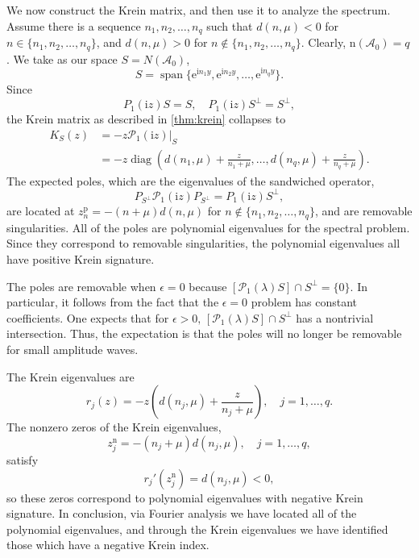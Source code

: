 \documentclass[review,onefignum,onetabnum]{siamart171218}
\def\diag{\mathop\mathrm{diag}\nolimits}
\def\Span{\mathop\mathrm{span}\nolimits}
\newcommand{\rme}{\mathrm{e}}
\newcommand{\rmi}{\mathrm{i}}
\newcommand{\rmn}{\mathrm{n}}
\newcommand{\rmp}{\mathrm{p}}
\newcommand{\calA}{\mathcal{A}}
\newcommand{\calP}{\mathcal{P}}
\newcommand{\vK}{\bm{\mathit{K}}}
\begin{document}
We now construct the Krein matrix, and then use it to analyze the spectrum.
Assume there is a sequence
$n_1,n_2,\dots,n_q$ such that $d(n,\mu)<0$ for $n\in\{n_1,n_2,\dots,n_q\}$,
and $d(n,\mu)>0$ for $n\notin\{n_1,n_2,\dots,n_q\}$. Clearly,
$\rmn(\calA_0)=q$. We take as our space $S=N(\calA_0)$,
\[
S=\Span\{\rme^{\rmi n_1y},\rme^{\rmi n_2 y},\dots,\rme^{\rmi n_q y}\}.
\]
Since
\[
P_1(\rmi z)S=S,\quad P_1(\rmi z)S^\perp=S^\perp,
\]
the Krein matrix as described in \cref{thm:krein} collapses to
\[
\begin{aligned}
\vK_S(z)&=-z\calP_1(\rmi z)|_S\\
&=-z\diag\left(d(n_1,\mu)+\frac{z}{n_1+\mu},\dots,d(n_q,\mu)+\frac{z}{n_q+\mu}\right).
\end{aligned}
\]
The expected poles, which are the eigenvalues of the sandwiched operator,
\[
P_{S^\perp}\calP_1(\rmi z)P_{S^\perp}=P_1(\rmi z)S^\perp,
\]
are located at
$z_n^\rmp=-(n+\mu)d(n,\mu)$ for $n\notin\{n_1,n_2,\dots,n_q\}$, and are
removable singularities. All of the poles are polynomial eigenvalues for the spectral
problem. Since they correspond to removable singularities, the polynomial
eigenvalues all have positive Krein signature.

\begin{remark}
The poles are removable when $\epsilon=0$ because  $[\calP_1(\lambda)S]\cap S^\perp=\{0\}$. In particular, it follows from the fact that the $\epsilon=0$ problem has constant coefficients.  One expects that for $\epsilon>0,\,[\calP_1(\lambda)S]\cap S^\perp$ has a nontrivial intersection. Thus, the expectation is that the poles will no longer be removable for small amplitude waves.
\end{remark}

The Krein eigenvalues are
\[
r_j(z)=-z\left(d(n_j,\mu)+\frac{z}{n_j+\mu}\right),\quad j=1,\dots,q.
\]
The nonzero zeros of the Krein eigenvalues,
\[
z_j^\rmn=-(n_j+\mu)d(n_j,\mu),\quad j=1,\dots,q,
\]
satisfy
\[
r_j'(z_j^\rmn)=d(n_j,\mu)<0,
\]
so these zeros correspond to polynomial eigenvalues with negative Krein
signature. In conclusion, via Fourier analysis we have located all of the polynomial eigenvalues, and through the Krein eigenvalues we have identified those which have a negative Krein index.
\end{document}
